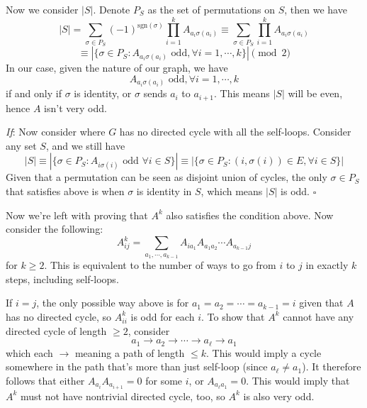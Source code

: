 \documentclass[11pt,a4paper]{article}
\newcommand{\<}{\langle}
\renewcommand{\>}{\rangle}
\begin{document}
\begin{enumerate}
	Now we consider $|S|$. Denote $P_S$ as the set of permutations on $S$, then we have 
	\[
	|S|= \sum_{\sigma\in P_S}(-1)^{\text{sgn}(\sigma)}\prod_{i=1}^k A_{a_i\sigma(a_i)}
	\equiv \sum_{\sigma\in P_S}\prod_{i=1}^k A_{a_i\sigma(a_i)}
	\]\[
	\equiv |\{\sigma\in P_S: A_{a_i\sigma(a_i)}\text{ odd}, \forall i=1, \cdots, k\}| \pmod{2}
	\]
	In our case, given the nature of our graph, we have 
	\[
	A_{a_i\sigma(a_i)}\text{ odd}, \forall i=1, \cdots, k
	\]
	if and only if $\sigma$ is identity, or $\sigma$ sends $a_i$ to $a_{i+1}$. 
	This means $|S|$ will be even, hence $A$ isn't very odd. 
	
	\emph{If}: Now consider where $G$ has no directed cycle with all the self-loops. 
	Consider any set $S$, and we still have 
	\[
	|S| \equiv |\{\sigma\in P_S: A_{i\sigma(i)}\text{ odd } \forall i\in S\}|
	\equiv |\{\sigma\in P_S: (i, \sigma(i))\in E,  \forall i\in S\}|
	\]
	Given that a permutation can be seen as disjoint union of cycles, the only $\sigma\in P_S$ that satisfies above is when $\sigma$ is identity in $S$, which means $|S|$ is odd. $\square$
	
	Now we're left with proving that $A^k$ also satisfies the condition above. Now consider the following: 
	\[
	A^k_{ij} = \sum_{a_1, \cdots, a_{k-1}}A_{ia_1}A_{a_1a_2}\cdots A_{a_{k-1}j}
	\]
	for $k\ge 2$. This is equivalent to the number of ways to go from $i$ to $j$ in exactly $k$ steps, including self-loops. 
	
	If $i=j$, the only possible way above is for $a_1=a_2=\cdots = a_{k-1}=i$ given that $A$ has no directed cycle, so $A^k_{ii}$ is odd for each $i$. 
	To show that $A^k$ cannot have any directed cycle of length $\ge 2$, consider 
	\[
	a_1\to a_2\to \cdots\to a_{\ell}\to a_1
	\]
	which each $\to$ meaning a path of length $\le k$. This would imply a cycle somewhere in the path that's more than just self-loop (since $a_{\ell}\neq a_1$). 
	It therefore follows that either $A_{a_i}A_{a_{i+1}}=0$ for some $i$, or $A_{a_{\ell}a_1}=0$. 
	This would imply that $A^k$ must not have nontrivial directed cycle, too, so $A^k$ is also very odd. 
		
\end{enumerate}
\end{document}
